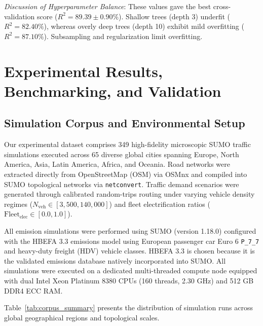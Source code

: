 \documentclass[journal]{IEEEtran}
\begin{document}
\textit{Discussion of Hyperparameter Balance}:
These values gave the best cross-validation score ($R^2 = 89.39 \pm 0.90\%$). Shallow trees (depth 3) underfit ($R^2 = 82.40\%$), whereas overly deep trees (depth 10) exhibit mild overfitting ($R^2 = 87.10\%$). Subsampling and regularization limit overfitting.

\section{Experimental Results, Benchmarking, and Validation}

\subsection{Simulation Corpus and Environmental Setup}
Our experimental dataset comprises 349 high-fidelity microscopic SUMO traffic simulations executed across 65 diverse global cities spanning Europe, North America, Asia, Latin America, Africa, and Oceania. Road networks were extracted directly from OpenStreetMap (OSM) via OSMnx \cite{Boeing2017} and compiled into SUMO topological networks via \texttt{netconvert}. Traffic demand scenarios were generated through calibrated random-trips routing under varying vehicle density regimes ($N_{\text{veh}} \in [3,500, 140,000]$) and fleet electrification ratios ($\text{Fleet}_{\text{elec}} \in [0.0, 1.0]$).

All emission simulations were performed using SUMO (version 1.18.0) \cite{Krajzewicz2012} configured with the HBEFA 3.3 emissions model \cite{Keller2017} using European passenger car Euro 6 \texttt{P\_7\_7} and heavy-duty freight (HDV) vehicle classes. HBEFA 3.3 is chosen because it is the validated emissions database natively incorporated into SUMO. All simulations were executed on a dedicated multi-threaded compute node equipped with dual Intel Xeon Platinum 8380 CPUs (160 threads, 2.30 GHz) and 512 GB DDR4 ECC RAM.

Table~\ref{tab:corpus_summary} presents the distribution of simulation runs across global geographical regions and topological scales.
\end{document}
